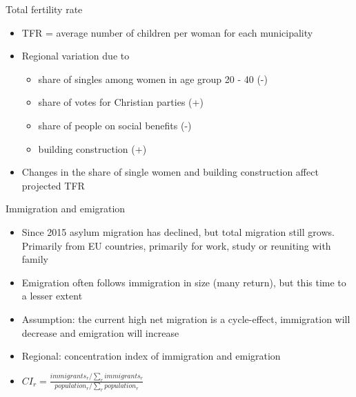 \documentclass[final, 12pt, aspectratio=169, xcolor={dvipsnames}]{beamer}
\newcommand*{\figs}{../figs}%
\begin{document}
\begin{frame}{Total fertility rate}
  \begin{itemize}
  \item TFR = average number of children per woman for each municipality
  \item Regional variation due to
    \begin{itemize}
    \item share of singles among women in age group 20 - 40 (-)
    \item share of votes for Christian parties (+)
    \item share of people on social benefits (-)
      \item building construction (+)
    \end{itemize}
    \item Changes in the share of single women and building construction affect projected TFR
    \end{itemize}
  
  \end{frame}

\begin{frame}{Total fertility rate in 2016 and 2035}
  \noindent
  \begin{minipage}[t]{0.48\linewidth}%
    \begin{figure}
    \texttt{[image: \\figs/\{tfr\_2016\_P2019.png]}}
  \end{figure}

\end{minipage}%
\hfill%
\begin{minipage}[t]{0.48\linewidth}
  \begin{figure}
    \texttt{[image: \\figs/\{tfr\_2035\_P2019.png]}}
  \end{figure}
\end{minipage}
  
  \end{frame}

\begin{frame}{Immigration and emigration}
  \begin{itemize}
  \item Since 2015 asylum migration has declined, but total migration still grows. Primarily from EU countries, primarily for work, study or reuniting with family
  \item Emigration often follows immigration in size (many return), but this time to a lesser extent
  \item Assumption: the current high net migration is a cycle-effect, immigration will decrease and emigration will increase
  \item Regional: concentration index of immigration and emigration
    \item $CI_{r} = \frac{immigrants_{r} / \sum_{r} immigrants_{r}}{population_{r} / \sum_{r} population_{r}}$
    \end{itemize}
  \end{frame}
\end{document}
